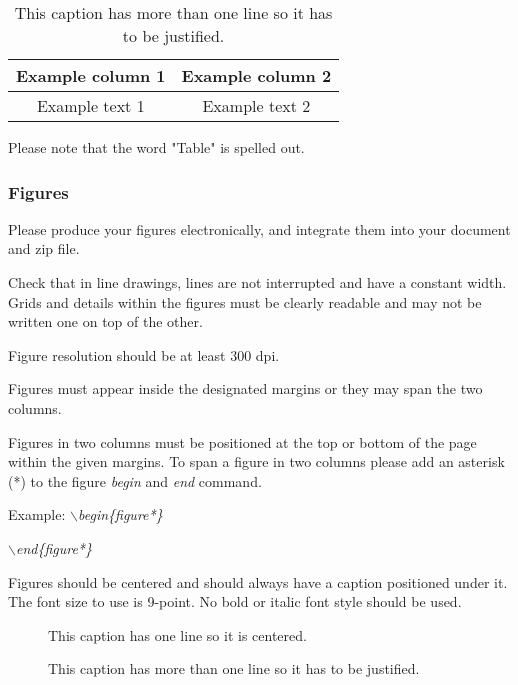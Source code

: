 \documentclass[a4paper,twoside]{article}
\begin{document}
\begin{table}[h]
\vspace{-0.2cm}
\caption{This caption has more than one line so it has to be
justified.}\label{tab:example2} \centering
\begin{tabular}{|c|c|}
  \hline
  Example column 1 & Example column 2 \\
  \hline
  Example text 1 & Example text 2 \\
  \hline
\end{tabular}
\end{table}

Please note that the word "Table" is spelled out.


\subsubsection{Figures}

Please produce your figures electronically, and integrate them into
your document and zip file.

Check that in line drawings, lines are not interrupted and have a
constant width. Grids and details within the figures must be clearly
readable and may not be written one on top of the other.

Figure resolution should be at least 300 dpi.

Figures must appear inside the designated margins or they may span
the two columns.

Figures in two columns must be positioned at the top or bottom of
the page within the given margins. To span a figure in two columns please add an asterisk (*) to the figure \textit{begin} and \textit{end} command.

Example: \textit{$\backslash$begin\{figure*\}}

\hspace*{1.5cm}\textit{$\backslash$end\{figure*\}}

Figures should be centered and should always have a caption
positioned under it. The font size to use is 9-point. No bold or
italic font style should be used.

\begin{figure}[!h]
  \centering
   {}
  \caption{This caption has one line so it is centered.}
  \label{fig:example1}
 \end{figure}

\begin{figure}[!h]
  \vspace{-0.2cm}
  \centering
   {}
  \caption{This caption has more than one line so it has to be justified.}
  \label{fig:example2}
\end{figure}
\end{document}
